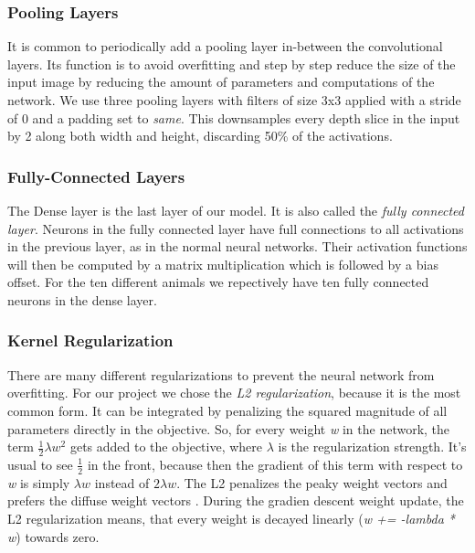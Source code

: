 \documentclass[journal]{IEEEtran}
\begin{document}
\subsubsection{Pooling Layers}
It is common to periodically add a pooling layer in-between the convolutional layers. Its function is to avoid overfitting and step by step reduce the size of the input image by reducing the amount of parameters and computations of the network. We use three pooling layers with filters of size 3x3 applied with a stride of 0 and a padding set to \textit{same}. This downsamples every depth slice in the input by 2 along both width and height, discarding 50\% of the activations. \\
\subsubsection{Fully-Connected Layers}
The Dense layer is the last layer of our model. It is also called the \textit{fully connected layer}. Neurons in the fully connected layer have full connections to all activations in the previous layer, as in the normal neural networks. Their activation functions will then be computed by a matrix multiplication which is followed by a bias offset. 
For the ten different animals we repectively have ten fully connected neurons in the dense layer. \\
\subsubsection{Kernel Regularization}
There are many different regularizations to prevent the neural network from overfitting. For our project we chose the \textit{L2 regularization}, because it is the most common form.
It can be integrated by penalizing the squared magnitude of all parameters directly in the objective. So, for every weight \textit{w} in the network, the term \(\frac{1}{2} \lambda w^2\) gets added to the objective, where \(\lambda \) is the regularization strength. It's usual to see \(\frac{1}{2}\) in the front, because then the gradient of this term with respect to \textit{w} is simply \(\lambda w\) instead of \(2 \lambda w\). The L2 penalizes the peaky weight vectors and prefers the diffuse weight vectors \cite{RN4}. During the gradien descent weight update, the L2 regularization means, that every weight is decayed linearly (\textit{w += -lambda * w}) towards zero. \\
\end{document}
